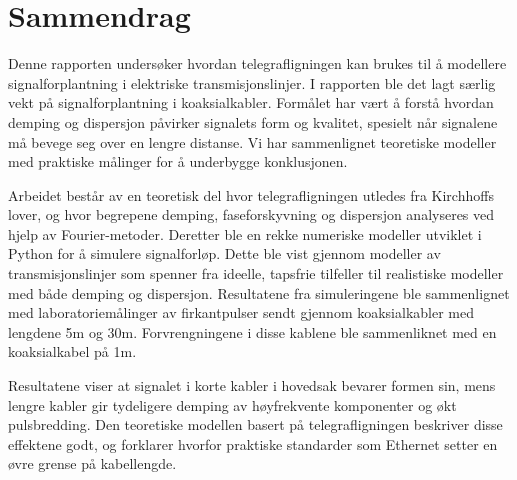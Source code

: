 \section*{Sammendrag}
Denne rapporten undersøker hvordan telegrafligningen kan brukes til å modellere signalforplantning i elektriske transmisjonslinjer. I rapporten ble det lagt særlig vekt på signalforplantning i koaksialkabler. Formålet har vært å forstå hvordan demping og dispersjon påvirker signalets form og kvalitet, spesielt når signalene må bevege seg over en lengre distanse. Vi har sammenlignet teoretiske modeller med praktiske målinger for å underbygge konklusjonen. 

Arbeidet består av en teoretisk del hvor telegrafligningen utledes fra Kirchhoffs lover, og hvor begrepene demping, faseforskyvning og dispersjon analyseres ved hjelp av Fourier-metoder. Deretter ble en rekke numeriske modeller utviklet i Python for å simulere signalforløp. Dette ble vist gjennom modeller av transmisjonslinjer som spenner fra ideelle, tapsfrie tilfeller til realistiske modeller med både demping og dispersjon. Resultatene fra simuleringene ble sammenlignet med laboratoriemålinger av firkantpulser sendt gjennom koaksialkabler med lengdene 5m og 30m. Forvrengningene i disse kablene ble sammenliknet med en koaksialkabel på 1m.

Resultatene viser at signalet i korte kabler i hovedsak bevarer formen sin, mens lengre kabler gir tydeligere demping av høyfrekvente komponenter og økt pulsbredding. Den teoretiske modellen basert på telegrafligningen beskriver disse effektene godt, og forklarer hvorfor praktiske standarder som Ethernet setter en øvre grense på kabellengde.

